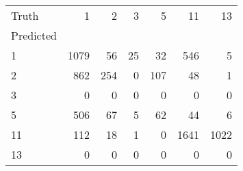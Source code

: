 \begin{tabular}{lrrrrrr}
\toprule
Truth & 1 & 2 & 3 & 5 & 11 & 13 \\
Predicted &  &  &  &  &  &  \\
\midrule
1 & 1079 & 56 & 25 & 32 & 546 & 5 \\
2 & 862 & 254 & 0 & 107 & 48 & 1 \\
3 & 0 & 0 & 0 & 0 & 0 & 0 \\
5 & 506 & 67 & 5 & 62 & 44 & 6 \\
11 & 112 & 18 & 1 & 0 & 1641 & 1022 \\
13 & 0 & 0 & 0 & 0 & 0 & 0 \\
\bottomrule
\end{tabular}
